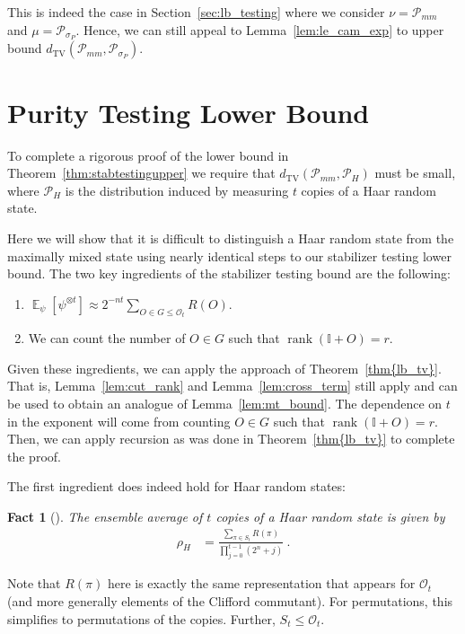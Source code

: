\documentclass[11pt]{article}
\newtheorem{fact}[theorem]{Fact}
\newcommand{\E}{\mathop{\mathbb{E}}}
\newcommand{\id}{\ensuremath{\mathbb{I}}}
\newcommand{\TV}{d_{\text{TV}}}
\newcommand{\Oc}{\mathcal{O}}
\DeclareMathOperator{\rank}{rank}
\begin{document}
This is indeed the case in Section~\ref{sec:lb_testing} where we consider $\nu = \mathcal{P}_{mm}$ and $\mu = \mathcal{P}_{\sigma_P}$. Hence, we can still appeal to Lemma~\ref{lem:le_cam_exp} to upper bound $\TV(\mathcal{P}_{mm},\mathcal{P}_{\sigma_P})$.

\section{Purity Testing Lower Bound}\label{app:purity}
To complete a rigorous proof of the lower bound in Theorem~\ref{thm:stabtestingupper} we require that $\TV(\mathcal{P}_{mm},\mathcal{P}_H)$ must be small, where $\mathcal{P}_H$ is the distribution induced by measuring $t$ copies of a Haar random state. 

Here we will show that it is difficult to distinguish a Haar random state from the maximally mixed state using nearly identical steps to our stabilizer testing lower bound. The two key ingredients of the stabilizer testing bound are the following:
\begin{enumerate}
    \item $\E_\psi[\psi^{\otimes t}] \approx 2^{-nt}\sum_{O \in G \leq \Oc_{t}} R(O)$. 
    \item We can count the number of $O \in G$ such that $\rank(\id +O) =r$.
\end{enumerate}

Given these ingredients, we can apply the approach of Theorem~\ref{thm{lb_tv}}. That is, Lemma~\ref{lem:cut_rank} and Lemma~\ref{lem:cross_term} still apply and can be used to obtain an analogue of Lemma~\ref{lem:mt_bound}. The dependence on $t$ in the exponent will come from counting $O \in G$ such that $\rank(\id +O) =r$. Then, we can apply recursion as was done in Theorem~\ref{thm{lb_tv}} to complete the proof.


The first ingredient does indeed hold for Haar random states:
\begin{fact}[{\cite[Proposition 6]{harrow2013church}}]
    The ensemble average of $t$ copies of a Haar random state is given by
    \begin{align}
        \rho_H & = \frac{\sum_{\pi \in S_t} R(\pi)}{\prod_{j=0}^{t-1}(2^n+j)}\ .
    \end{align}
\end{fact}
Note that $R(\pi)$ here is exactly the same representation that appears for $\Oc_t$ (and more generally elements of the Clifford commutant). For permutations, this simplifies to permutations of the copies. Further, $S_t \leq \Oc_t$. 
\end{document}
